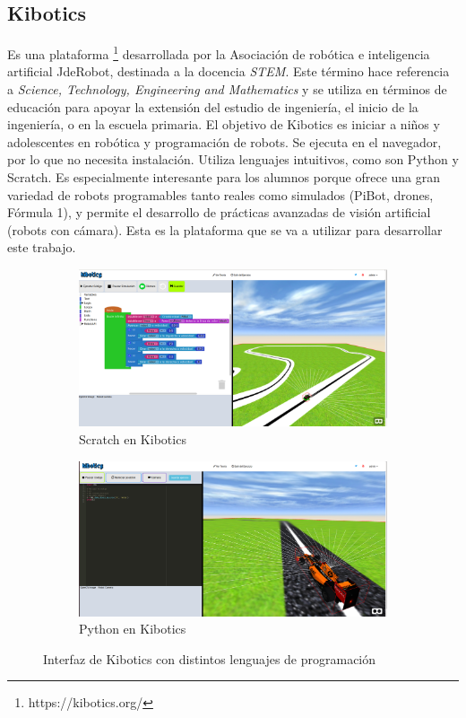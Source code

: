 \documentclass{report}
\begin{document}
\newpage
\subsection{Kibotics} 

Es una plataforma \footnote{https://kibotics.org/} \cite{Kibotics} desarrollada por la Asociación de robótica e inteligencia artificial JdeRobot, destinada a la docencia \textit{STEM}. Este término hace referencia a \textit{Science, Technology, Engineering and  Mathematics} y se utiliza en términos de educación para apoyar la extensión del estudio de ingeniería, el inicio de la ingeniería, o en la escuela primaria. El objetivo de Kibotics es iniciar a niños y adolescentes en robótica y programación de robots. Se ejecuta en el navegador, por lo que no necesita instalación. Utiliza lenguajes intuitivos, como son Python y Scratch. Es especialmente interesante para los alumnos porque ofrece una gran variedad de robots programables tanto reales como simulados (PiBot, drones, Fórmula 1), y permite el desarrollo de prácticas avanzadas de visión artificial (robots con cámara). Esta es la plataforma que se va a utilizar para desarrollar este trabajo.

\renewcommand{\figurename}{Figura}
\begin{figure}[h]
\centering
	\begin{subfigure}[h]{\textwidth}
	\centering
	 \includegraphics[scale=0.15]{images/scratch+websim.png}
	 \caption{Scratch en Kibotics}
	\end{subfigure}
	\begin{subfigure}[h]{\textwidth}
	\centering
	 \includegraphics[scale=0.15]{images/python+websim.png}
	 \caption{Python en Kibotics}
	\end{subfigure}
	\caption{Interfaz de Kibotics con distintos lenguajes de programación}
\end{figure}
\end{document}

